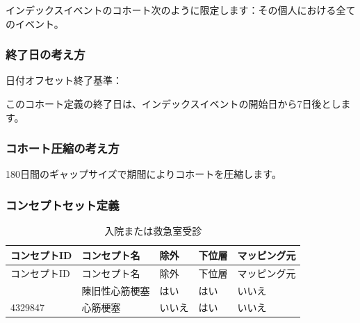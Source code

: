 \documentclass[
  11pt]{book}
\theoremstyle{definition}
\theoremstyle{definition}
\theoremstyle{definition}
\theoremstyle{definition}
\theoremstyle{remark}
\begin{document}
インデックスイベントのコホート次のように限定します：その個人における全てのイベント。

\subsubsection*{終了日の考え方}\label{ux7d42ux4e86ux65e5ux306eux8003ux3048ux65b9-2}

日付オフセット終了基準：

このコホート定義の終了日は、インデックスイベントの開始日から7日後とします。

\subsubsection*{コホート圧縮の考え方}\label{ux30b3ux30dbux30fcux30c8ux5727ux7e2eux306eux8003ux3048ux65b9-2}

180日間のギャップサイズで期間によりコホートを圧縮します。

\subsubsection*{コンセプトセット定義}\label{ux30b3ux30f3ux30bbux30d7ux30c8ux30bbux30c3ux30c8ux5b9aux7fa9-2}

\begin{longtable}[]{@{}lllll@{}}
\caption{\label{tab:ami} 入院または救急室受診}\tabularnewline
\toprule\noalign{}
コンセプトID & コンセプト名 & 除外 & 下位層 & マッピング元 \\
\midrule\noalign{}
\endfirsthead
\toprule\noalign{}
コンセプトID & コンセプト名 & 除外 & 下位層 & マッピング元 \\
\midrule\noalign{}
\endhead
\bottomrule\noalign{}
\endlastfoot
314666 & 陳旧性心筋梗塞 & はい & はい & いいえ \\
4329847 & 心筋梗塞 & いいえ & はい & いいえ \\
\end{longtable}
\end{document}
